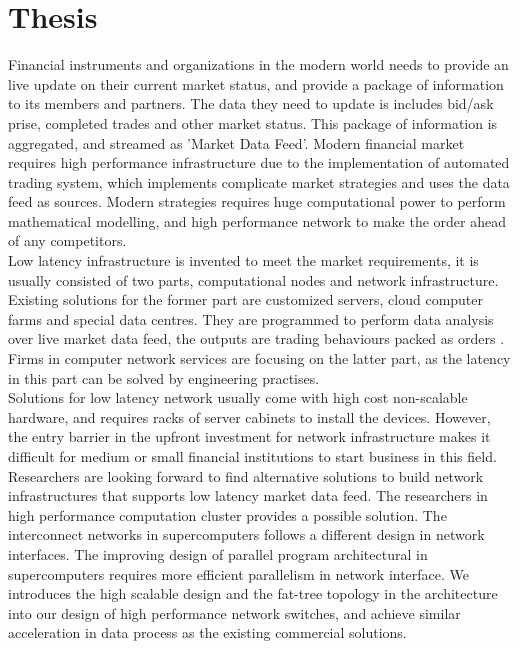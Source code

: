 \documentclass[11pt,openright,a4paper]{report}
\begin{document}
\section{Thesis}
Financial instruments and organizations in the modern world needs to provide an live update on their current market status, and provide a package of information to its members and partners. The data they need to update is includes bid/ask prise, completed trades and other market status\cite{alexander2001market}. This package of information is aggregated, and streamed as 'Market Data Feed'. Modern financial market requires high performance infrastructure due to the implementation of automated trading system, which implements complicate market strategies and uses the data feed as sources\cite{le2009automated}. Modern strategies requires huge computational power to perform mathematical modelling, and high performance network to make the order ahead of any competitors.\\
Low latency infrastructure is invented to meet the market requirements, it is usually consisted of two parts,  computational nodes and network infrastructure. Existing solutions for the former part are customized servers, cloud computer farms and special data centres. They are programmed to perform data analysis over live market data feed, the outputs are trading behaviours packed as orders . Firms in computer network services are focusing on the latter part, as the latency in this part can be solved by engineering practises.\\
Solutions for low latency network usually come with high cost non-scalable hardware, and requires racks of server cabinets to install the devices. However, the entry barrier in the upfront investment for network infrastructure makes it difficult for medium or small financial institutions to start business in this field.\\
Researchers are looking forward to find alternative solutions to build network infrastructures that supports low latency market data feed. The researchers in high performance computation cluster provides a possible solution. The interconnect networks in supercomputers follows a different design in network interfaces. The improving design of parallel program architectural in supercomputers requires more efficient parallelism in network interface\cite{pang2014th}. We introduces the high scalable design and the fat-tree topology in the architecture into our design of high performance network switches, and achieve similar acceleration in data process as the existing commercial solutions.\\
\end{document}
